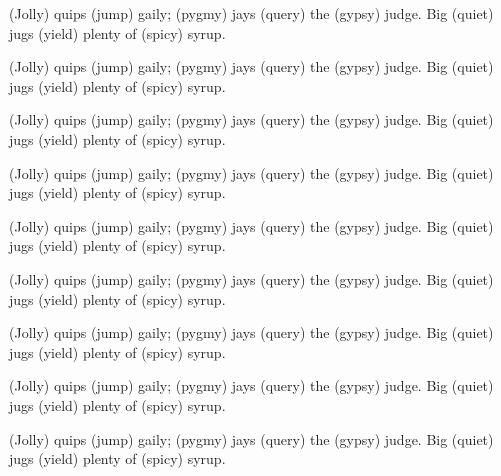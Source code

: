 \documentclass{article}
\begin{document}
{\Huge (Jolly) quips (jump) gaily; (pygmy) jays (query) the (gypsy) judge. Big (quiet) jugs (yield) plenty of (spicy) syrup.\par}
{\Huge (Jolly) quips (jump) gaily; (pygmy) jays (query) the (gypsy) judge. Big (quiet) jugs (yield) plenty of (spicy) syrup.\par}
{\Huge (Jolly) quips (jump) gaily; (pygmy) jays (query) the (gypsy) judge. Big (quiet) jugs (yield) plenty of (spicy) syrup.\par}
{\Huge (Jolly) quips (jump) gaily; (pygmy) jays (query) the (gypsy) judge. Big (quiet) jugs (yield) plenty of (spicy) syrup.\par}
{\Huge (Jolly) quips (jump) gaily; (pygmy) jays (query) the (gypsy) judge. Big (quiet) jugs (yield) plenty of (spicy) syrup.\par}
{\Huge (Jolly) quips (jump) gaily; (pygmy) jays (query) the (gypsy) judge. Big (quiet) jugs (yield) plenty of (spicy) syrup.\par}
{\Huge (Jolly) quips (jump) gaily; (pygmy) jays (query) the (gypsy) judge. Big (quiet) jugs (yield) plenty of (spicy) syrup.\par}
{\Huge (Jolly) quips (jump) gaily; (pygmy) jays (query) the (gypsy) judge. Big (quiet) jugs (yield) plenty of (spicy) syrup.\par}
{\Huge (Jolly) quips (jump) gaily; (pygmy) jays (query) the (gypsy) judge. Big (quiet) jugs (yield) plenty of (spicy) syrup.\par}
\end{document}
